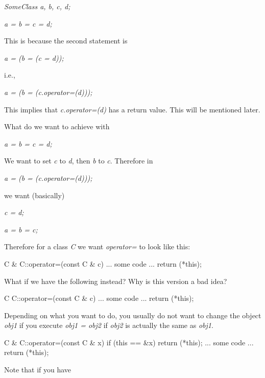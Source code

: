 \textit{SomeClass a, b, c, d;}

\textit{a = b = c = d;}

This is because the second statement is

\textit{a = (b = (c = d));}

i.e.,

\textit{a = (b = (c.operator=(d)));}

This implies that \textit{c.operator=(d)} has a return value. This will be
mentioned later.


\newpage{}

What do we want to achieve with

\textit{a = b = c = d;}

We want to set \textit{c} to \textit{d}, then \textit{b} to \textit{c}.
Therefore in

\textit{a = (b = (c.operator=(d)));}

we want (basically)

\textit{c = d;}

\textit{a = b = c;}

Therefore for a class \textit{C} we want \textit{operator=} to look like
this:

\begin{consolethree}[escapeinside=||]
C & C::operator=(const C & c)
{
    ... some code ...
    return (*this);
}
\end{consolethree}

What if we have the following instead? Why is this version a bad idea?

\begin{consolethree}[escapeinside=||]
C C::operator=(const C & c)
{
    ... some code ...
    return (*this);
}
\end{consolethree}


\newpage{}

Depending on what you want to do, you usually do not want to change the
object \textit{obj1} if you execute \textit{obj1 = obj2} if \textit{obj2} is
actually the same as \textit{obj1}.

\begin{consolethree}[escapeinside=||]
C & C::operator=(const C & x)
{
    if (this == &x)
        return (*this);
    ... some code ...
    return (*this);
}
\end{consolethree}


\newpage{}

Note that if you have


